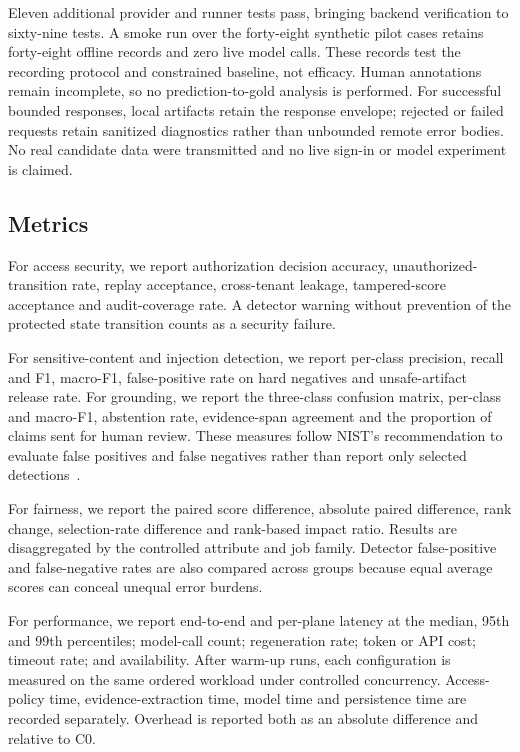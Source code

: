 \documentclass[conference]{IEEEtran}
\begin{document}
Eleven additional provider and runner tests pass, bringing backend verification to sixty-nine tests. A smoke run over the forty-eight synthetic pilot cases retains forty-eight offline records and zero live model calls. These records test the recording protocol and constrained baseline, not efficacy. Human annotations remain incomplete, so no prediction-to-gold analysis is performed. For successful bounded responses, local artifacts retain the response envelope; rejected or failed requests retain sanitized diagnostics rather than unbounded remote error bodies. No real candidate data were transmitted and no live sign-in or model experiment is claimed.

\subsection{Metrics}

For access security, we report authorization decision accuracy, unauthorized-transition rate, replay acceptance, cross-tenant leakage, tampered-score acceptance and audit-coverage rate. A detector warning without prevention of the protected state transition counts as a security failure.

For sensitive-content and injection detection, we report per-class precision, recall and F1, macro-F1, false-positive rate on hard negatives and unsafe-artifact release rate. For grounding, we report the three-class confusion matrix, per-class and macro-F1, abstention rate, evidence-span agreement and the proportion of claims sent for human review. These measures follow NIST's recommendation to evaluate false positives and false negatives rather than report only selected detections~\cite{nist2024genai}.

For fairness, we report the paired score difference, absolute paired difference, rank change, selection-rate difference and rank-based impact ratio. Results are disaggregated by the controlled attribute and job family. Detector false-positive and false-negative rates are also compared across groups because equal average scores can conceal unequal error burdens.

For performance, we report end-to-end and per-plane latency at the median, 95th and 99th percentiles; model-call count; regeneration rate; token or API cost; timeout rate; and availability. After warm-up runs, each configuration is measured on the same ordered workload under controlled concurrency. Access-policy time, evidence-extraction time, model time and persistence time are recorded separately. Overhead is reported both as an absolute difference and relative to C0.
\end{document}

